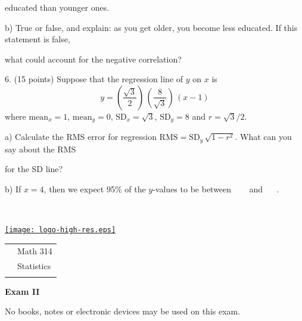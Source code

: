 \documentclass[10pt]{article}
\begin{document}
\hspace{20pt} \hphantom{a) }  educated than younger ones.
\bigskip

\hspace{20pt} b) True or false, and explain:  as you get older, you become less educated.  
If this statement is false,\vspace{-4pt}

\hspace{20pt} \hphantom{a) }
what could account for the negative correlation?  
\vspace{2in}


6. (15 points) Suppose that the regression line of $y$ on $x$ 
is \[y=\left(\frac{\sqrt{3}}{2}\right)\,\left(\frac{8}{\sqrt{3}}\right)\,(x-1)\] 
where $\mbox{mean}_x=1$, $\mbox{mean}_y=0$, $\mbox{SD}_x=\sqrt{3}$, $\mbox{SD}_y=8$
and $r=\sqrt{3}/2$.\vspace{3pt}

\hspace{20pt} a) Calculate the RMS error for regression 
$\mbox{RMS}=\mbox{SD}_y\,\sqrt{1-r^2}$.  What can you say about the RMS\vspace{-4pt}

\hspace{20pt}\hphantom{b) } for the SD line?
\vspace{2in}

\hspace{20pt} b) If $x=4$, then we expect 95\% of the $y$-values to be
between \ \underline{\hspace{60pt}} \ \ and \  \underline{\hspace{60pt}} \ .
\vspace{2in}



\vfill
\eject

{\ }
\vfill
\eject

\href{http://www.shepherd.edu}{\texttt{[image: logo-high-res.eps]}}
\vspace{-1.69cm}

{\small
\begin{tabular}{cl}
& Math 314\\
& Statistics\\
\hspace{5.28in} & %
\end{tabular}
}
\setlength{\baselineskip}{1.05\baselineskip}

\begin{center}
\textbf{\large  Exam II}
\end{center}
No books, notes or electronic devices may be used on this exam.
\medskip
\end{document}
